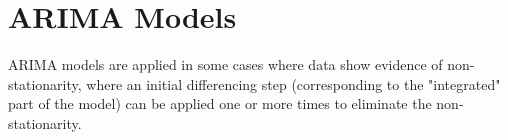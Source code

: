 \chapter{ARIMA Models}

ARIMA models are applied in some cases where data show evidence of non-stationarity, where an initial differencing step (corresponding to the "integrated" part of the model) can be applied one or more times to eliminate the non-stationarity.